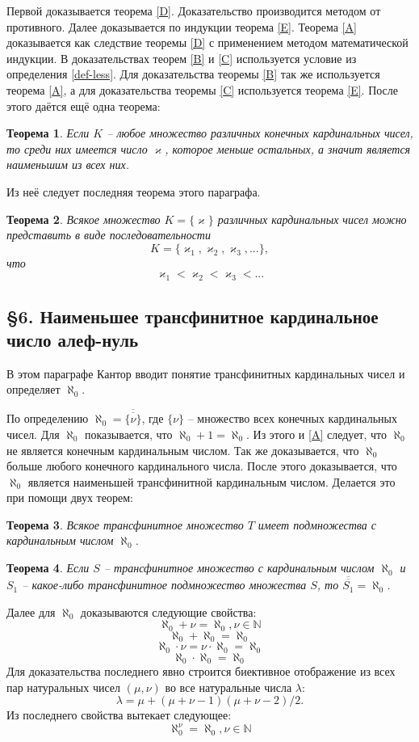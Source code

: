\documentclass[a4paper,12pt]{extarticle}
\newtheorem{theorem}{Теорема}[subsection]
\theoremstyle{definition}
\newcommand{\car}[1]{\overline{\overline{#1}}}
\begin{document}
Первой доказывается теорема \ref{D}.
Доказательство производится методом от противного.
Далее доказывается по индукции теорема \ref{E}.
Теорема \ref{A} доказывается как следствие теоремы \ref{D} с применением методом математической индукции.
В доказательствах теорем \ref{B} и \ref{C} используется условие из определения \ref{def-less}.
Для доказательства теоремы \ref{B} так же используется теорема \ref{A}, а для доказательства теоремы \ref{C} используется теорема \ref{E}.
После этого даётся ещё одна теорема:
\begin{theorem}
\label{F}
Если $K$ -- любое множество различных конечных кардинальных чисел, то среди них имеется число $\varkappa$, которое меньше остальных, а значит является наименьшим из всех них.
\end{theorem}
Из неё следует последняя теорема этого параграфа.
\begin{theorem}
\label{G}
    Всякое множество $K = \{\varkappa\}$ различных кардинальных чисел можно представить в виде последовательности 
    $$K = \{\varkappa_1, \varkappa_2, \varkappa_3, ...\},$$ что $$\varkappa_1 < \varkappa_2 < \varkappa_3 < ...$$
\end{theorem}

\subsection{\S 6. Наименьшее трансфинитное кардинальное число алеф-нуль}
В этом параграфе Кантор вводит понятие трансфинитных кардинальных чисел и определяет $\aleph_0$.

По определению $\aleph_0 = \car{\{\nu\}}$, где $\{\nu\}$ -- множество всех конечных кардинальных чисел.
Для $\aleph_0$ показывается, что $\aleph_0 + 1 = \aleph_0$.
Из этого и \ref{A} следует, что $\aleph_0$ не является конечным кардинальным числом.
Так же доказывается, что $\aleph_0$ больше любого конечного кардинального числа.
После этого доказывается, что $\aleph_0$ является наименьшей трансфинитной кардинальным числом.
Делается это при помощи двух теорем:
\begin{theorem}
    Всякое трансфинитное множество $T$ имеет подмножества с кардинальным числом $\aleph_0$.
\end{theorem}
\begin{theorem}
    Если $S$ -- трансфинитное множество с кардинальным числом $\aleph_0$ и $S_1$ -- какое-либо трансфинитное подмножество множества $S$, то $\car{S_1} = \aleph_0$.
\end{theorem}

Далее для $\aleph_0$ доказываются следующие свойства:
$$ \aleph_0 + \nu = \aleph_0, \nu \in \mathbb{N} $$
$$ \aleph_0 + \aleph_0 = \aleph_0 $$
$$ \aleph_0 \cdot \nu = \nu \cdot \aleph_0 = \aleph_0 $$
$$ \aleph_0 \cdot \aleph_0 = \aleph_0 $$
Для доказательства последнего явно строится биективное отображение из всех пар натуральных чисел $(\mu, \nu)$ во все натуральные числа $\lambda$:
$$ \lambda = \mu + (\mu + \nu - 1)(\mu + \nu - 2)/2. $$
Из последнего свойства вытекает следующее:
$$ \aleph_0^{\nu} = \aleph_0, \nu \in \mathbb{N} $$
\end{document}
